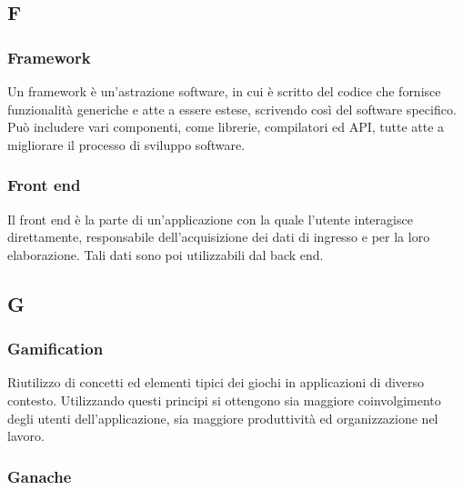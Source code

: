 
\subsection*{F}

\subsubsection*{Framework}
Un framework è un'astrazione software, in cui è scritto del codice che fornisce funzionalità generiche e atte a essere estese, scrivendo così del software specifico. Può includere vari componenti, come librerie, compilatori ed API\glo, tutte atte a migliorare il processo di sviluppo software.

\subsubsection*{Front end}
Il front end è la parte di un'applicazione con la quale l'utente interagisce direttamente, responsabile dell'acquisizione dei dati di ingresso e per la loro elaborazione. Tali dati sono poi utilizzabili dal back end\glo. 

\subsection*{G}

\subsubsection*{Gamification}
Riutilizzo di concetti ed elementi tipici dei giochi in applicazioni di diverso contesto. Utilizzando questi principi si ottengono sia maggiore coinvolgimento degli utenti dell'applicazione, sia maggiore produttività ed organizzazione nel lavoro.

\subsubsection*{Ganache}

